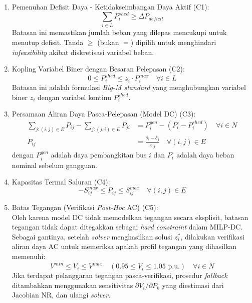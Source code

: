 \begin{enumerate}
\item[a.] Pemenuhan Defisit Daya - Ketidakseimbangan Daya Aktif (C1):
\begin{equation}
    \sum_{i\in L} P_{i}^{shed} \ge \Delta P_{deficit}
\end{equation}
Batasan ini memastikan jumlah beban yang dilepas mencukupi untuk menutup defisit. Tanda $\ge$ (bukan $=$) dipilih untuk menghindari \textit{infeasibility} akibat diskretisasi variabel beban.

\item[b.] Kopling Variabel Biner dengan Besaran Pelepasan (C2):
\begin{equation}
    0 \le P_{i}^{shed} \le z_{i} \cdot P_{i}^{max} \quad \forall i\in L
\end{equation}
Batasan ini adalah formulasi \textit{Big-M standard} yang menghubungkan variabel biner $z_{i}$ dengan variabel kontinu $P_{i}^{shed}$.

\item[c.] Persamaan Aliran Daya Pasca-Pelepasan (Model DC) (C3):
\begin{equation}
    \begin{aligned}
        \sum_{j:(i,j)\in E} P_{ij} - \sum_{j:(j,i)\in E} P_{ji} &= P_{i}^{gen} - (P_{i}^{\circ}-P_{i}^{shed}) \quad \forall i\in N \\
        P_{ij} &= \frac{\delta_{i}-\delta_{j}}{x_{ij}} \quad \forall(i,j)\in E
    \end{aligned}
\end{equation}
dengan $P_{i}^{gen}$ adalah daya pembangkitan bus $i$ dan $P_{i}^{\circ}$ adalah daya beban nominal sebelum gangguan.

\item[d.] Kapasitas Termal Saluran (C4):
\begin{equation}
    -S_{ij}^{max} \le P_{ij} \le S_{ij}^{max} \quad \forall(i,j)\in E
\end{equation}

\item[e.] Batas Tegangan (Verifikasi \textit{Post-Hoc} AC) (C5):\\
Oleh karena model DC tidak memodelkan tegangan secara eksplisit, batasan tegangan tidak dapat ditegakkan sebagai \textit{hard constraint} dalam MILP-DC. Sebagai gantinya, setelah \textit{solver} menghasilkan solusi $z_{i}^{*}$, dilakukan verifikasi aliran daya AC untuk memeriksa apakah profil tegangan yang dihasilkan memenuhi:
\begin{equation}
    V^{min} \le V_{i} \le V^{max} \quad (0.95 \le V_{i} \le 1.05 \text{ p.u.}) \quad \forall i\in N
\end{equation}
Jika terdapat pelanggaran tegangan pasca-verifikasi, prosedur \textit{fallback} ditambahkan menggunakan sensitivitas $\partial V_{i}/\partial P_{k}$ yang diestimasi dari Jacobian NR, dan ulangi \textit{solver}.


\end{enumerate}
